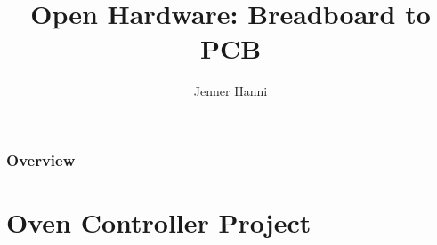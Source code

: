 \documentclass{beamer}
\title[Breadboard to PCB]{Open Hardware: Breadboard to PCB} %
\author{Jenner Hanni} %
\institute[Open Source Bridge 2014] %
{
Open Source Bridge 2014 \\ %
\medskip
\textit{jeh.wicker@gmail.com} %
}
\begin{document}
\begin{frame}
\titlepage %
\end{frame}

\begin{frame}
\frametitle{Overview} %
\tableofcontents %
\end{frame}


\section{Oven Controller Project} 
\end{document}
